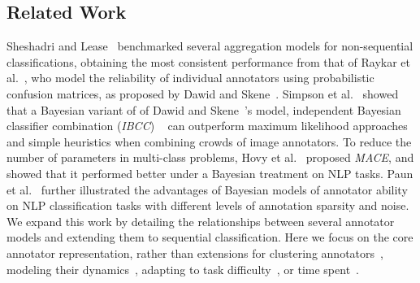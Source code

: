 \subsection{Related Work}
Sheshadri and Lease~ benchmarked several 
aggregation models for non-sequential classifications, 
obtaining the most consistent performance from 
that of Raykar et al.~, who
model the reliability of individual annotators
using probabilistic confusion matrices,
as proposed by Dawid and Skene~.
Simpson et al.~ showed that a Bayesian variant of of Dawid and Skene~'s model, independent Bayesian classifier combination
(\emph{IBCC}) ~\cite{kim2012bayesian} 
can outperform maximum likelihood approaches and simple heuristics
when combining crowds of image annotators.
To reduce the number of parameters in multi-class problems,
Hovy et al.~ proposed \emph{MACE}, 
and showed that it performed better under a Bayesian treatment on NLP tasks.
Paun et al.~ further illustrated
the advantages of Bayesian models of annotator ability on NLP classification tasks
with different levels of annotation sparsity and noise.
We expand this work by detailing the relationships between several annotator models
and extending them to sequential classification. 
Here we focus on the core annotator representation, rather than extensions 
for clustering annotators~\cite{venanzi2014community,moreno_bayesian_2015},
modeling their dynamics~\cite{simpsonlong},
adapting to task difficulty~\cite{whitehill2009whose,bachrach2012grade},
or time spent~\cite{venanzi2016time}.

